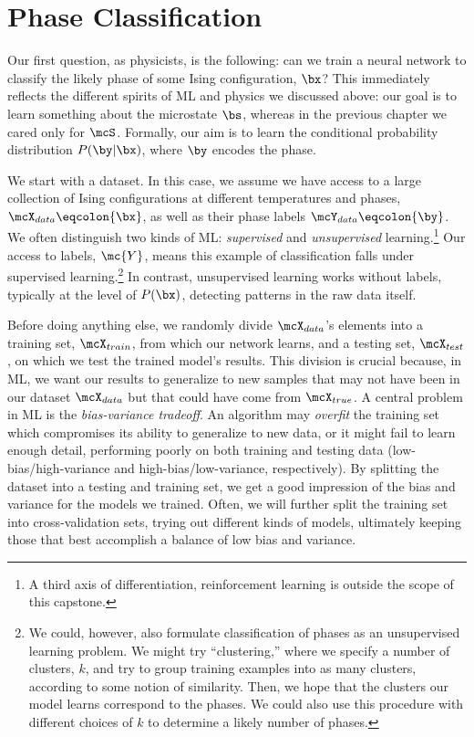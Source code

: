 \section{Phase Classification}
Our first question, as physicists, is the following: can we train a
neural network to classify the likely phase of some Ising
configuration, $\bx$? This immediately reflects the different spirits
of ML and physics we discussed above: our goal is to learn something
about the microstate $\bs$, whereas in the previous chapter we cared
only for $\mcS$. Formally, our aim is to learn the conditional
probability distribution $P(\by|\bx)$, where $\by$ encodes the phase.

We start with a dataset. In this case, we assume we have access to a
large collection of Ising configurations at different temperatures and
phases, $\mcX_{data}\eqcolon\{\bx \}$, as well as their phase labels
$\mcY_{data}\eqcolon\{\by\}$. We often distinguish two kinds of ML\@:
\textit{supervised} and \textit{unsupervised} learning.\footnote{A
  third axis of differentiation, reinforcement learning is outside the
  scope of this capstone.} Our access to labels, $\mc{Y}$, means this
example of classification falls under supervised learning.\footnote{We
  could, however, also formulate classification of phases as an
  unsupervised learning problem. We might try ``clustering,'' where we
  specify a number of clusters, $k$, and try to group training
  examples into as many clusters, according to some notion of
  similarity. Then, we hope that the clusters our model learns
  correspond to the phases. We could also use this procedure with
  different choices of $k$ to determine a likely number of phases.} In
contrast, unsupervised learning works without labels, typically at the
level of $P(\bx)$, detecting patterns in the raw data itself.

Before doing anything else, we randomly divide $\mcX_{data}$'s
elements into a training set, $\mcX_{train}$, from which our network
learns, and a testing set, $\mcX_{test}$, on which we test the trained
model's results. This division is crucial because, in ML, we want our
results to generalize to new samples that may not have been in our
dataset $\mcX_{data}$ but that could have come from $\mcX_{true}$. A
central problem in ML is the \textit{bias-variance tradeoff}. An
algorithm may \textit{overfit} the training set which compromises its
ability to generalize to new data, or it might fail to learn enough
detail, performing poorly on both training and testing data
(low-bias/high-variance and high-bias/low-variance, respectively). By
splitting the dataset into a testing and training set, we get a good
impression of the bias and variance for the models we trained. Often,
we will further split the training set into cross-validation sets,
trying out different kinds of models, ultimately keeping those that
best accomplish a balance of low bias and variance.

